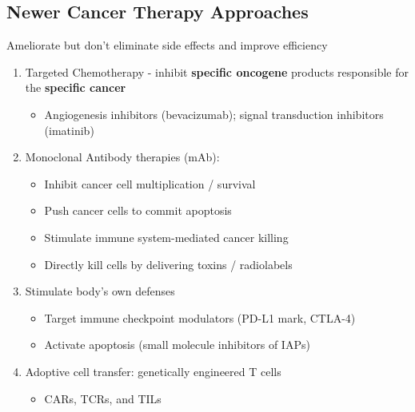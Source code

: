 \documentclass[10pt]{article}
\begin{document}
\subsection*{Newer Cancer Therapy Approaches}
Ameliorate but don't eliminate side effects and improve efficiency
\begin{enumerate}
	\item Targeted Chemotherapy - inhibit \textbf{specific oncogene} products responsible for the \textbf{specific cancer}
	\begin{itemize}
        \item Angiogenesis inhibitors (bevacizumab); signal transduction inhibitors (imatinib)
    \end{itemize}
    \item Monoclonal Antibody therapies (mAb):
    \begin{itemize}
        \item Inhibit cancer cell multiplication / survival
        \item Push cancer cells to commit apoptosis
        \item Stimulate immune system-mediated cancer killing
        \item Directly kill cells by delivering toxins / radiolabels
    \end{itemize}
    \item Stimulate body's own defenses
    \begin{itemize}
        \item Target immune checkpoint modulators (PD-L1 mark, CTLA-4)
        \item Activate apoptosis (small molecule inhibitors of IAPs)
    \end{itemize}
    \item Adoptive cell transfer: genetically engineered T cells
    \begin{itemize}
        \item CARs, TCRs, and TILs
    \end{itemize}
\end{enumerate}
\end{document}
